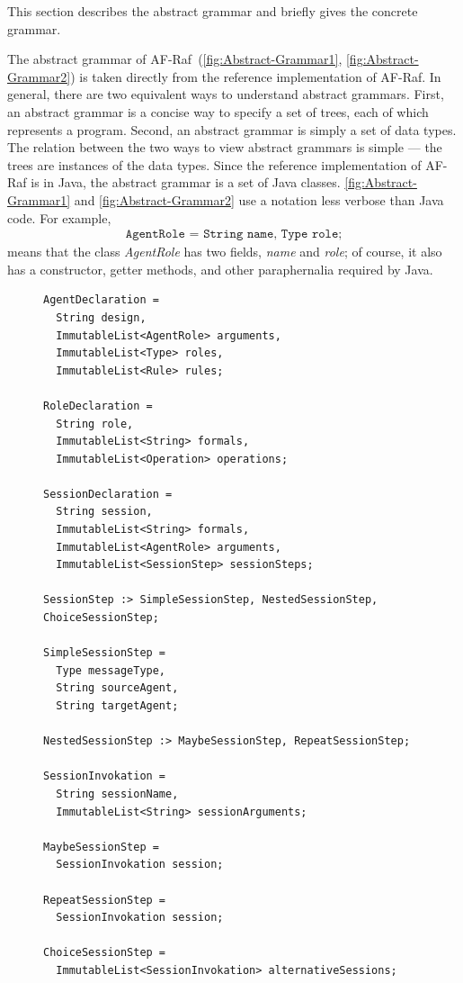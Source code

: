 \documentclass[a4paper,12pt,oneside,fleqn]{book} %
\begin{document}
{This section describes the abstract grammar and briefly gives the concrete
grammar.

The abstract grammar of AF-Raf~(\autoref{fig:Abstract-Grammar1},
\autoref{fig:Abstract-Grammar2}) is taken
directly from the reference implementation of AF-Raf.  In general, there
are two equivalent ways to understand abstract grammars. First, an abstract
grammar is a concise way to specify a set of trees, each of which
represents a program. Second, an abstract grammar is simply a set of data
types. The relation between the two ways to view abstract grammars is
simple --- the trees are instances of the data types. Since the reference
implementation of AF-Raf is in Java, the abstract grammar is a set of Java
classes. \autoref{fig:Abstract-Grammar1} and \autoref{fig:Abstract-Grammar2} use a notation less verbose than Java code. For example,
\begin{align}
\texttt{AgentRole = String name, Type role;}
\end{align}
means that the class {\it AgentRole\/} has two fields, {\it name\/} and
{\it role}; of course, it also has a constructor, getter methods, and other
paraphernalia required by Java.

\begin{figure}\footnotesize %
\begin{verbatim}
AgentDeclaration =
  String design,
  ImmutableList<AgentRole> arguments,
  ImmutableList<Type> roles,
  ImmutableList<Rule> rules;

RoleDeclaration =
  String role,
  ImmutableList<String> formals,
  ImmutableList<Operation> operations;

SessionDeclaration =
  String session,
  ImmutableList<String> formals,
  ImmutableList<AgentRole> arguments,
  ImmutableList<SessionStep> sessionSteps;

SessionStep :> SimpleSessionStep, NestedSessionStep, ChoiceSessionStep;

SimpleSessionStep =
  Type messageType,
  String sourceAgent,
  String targetAgent;

NestedSessionStep :> MaybeSessionStep, RepeatSessionStep;

SessionInvokation =
  String sessionName,
  ImmutableList<String> sessionArguments;

MaybeSessionStep =
  SessionInvokation session;

RepeatSessionStep =
  SessionInvokation session;

ChoiceSessionStep =
  ImmutableList<SessionInvokation> alternativeSessions;


\end{verbatim}
\end{figure}}
\end{document}
